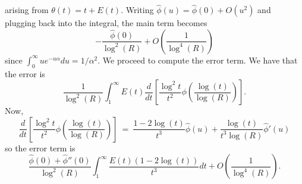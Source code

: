 \documentclass[11pt, reqno]{amsart}
\makeatletter
\renewenvironment{proof}[1][\proofname]{\par
  \vspace{-.7\topsep}%
  \pushQED{\qed}%
  \normalfont
  \topsep0pt \partopsep0pt %
  \trivlist
  \item[\hskip\labelsep
        \itshape
    #1\@addpunct{.}]\ignorespaces
}{%
  \popQED\endtrivlist\@endpefalse
  \addvspace{6pt plus 6pt} %
}
\theoremstyle{definition}
\theoremstyle{remark}
\numberwithin{equation}{section}
\renewcommand{\hat}{\widehat}
\makeatother
\begin{document}
\begin{proof}
\begin{equation}
\end{equation}
arising from $\theta(t)=t+E(t).$ Writing $\hat\phi(u)=\hat\phi(0)+O(u^2)$ and plugging back into the integral, the main term becomes
\begin{equation}
    -\frac{\hat\phi(0)}{\log^2(R)}+O\left(\frac{1}{\log^4(R)}\right)
\end{equation}
since $\int_0^\infty ue^{-u\alpha}du=1/\alpha^2.$
We proceed to compute the error term. We have that the error is
\begin{equation}
    \frac{1}{\log^2(R)}\int_1^\infty E(t)\dfrac{d}{dt}\left[ \frac{\log^2 t}{t^2}\phi\left(\frac{\log(t)}{\log(R)}\right)\right].
\end{equation}
Now,
\begin{equation}
    \dfrac{d}{dt}\left[ \frac{\log^2 t}{t^2}\phi\left(\frac{\log(t)}{\log(R)}\right)\right] \ = \ \frac{1-2\log(t)}{t^3}\hat\phi(u)+\frac{\log(t)}{t^3\log(R)}\hat\phi'(u)
\end{equation}
so the error term is 
\begin{equation}
    \frac{\hat \phi(0)+\hat\phi''(0)}{\log^2(R)}\int_1^\infty \frac{E(t)(1-2\log(t))}{t^3}dt+O\left(\frac{1}{\log^4(R)}\right).
\end{equation}
\end{proof}
\end{document}
